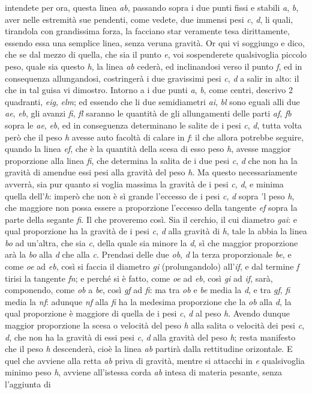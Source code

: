 \documentclass[11pt,twoside,openany]{book}
\begin{document}
intendete per ora, questa linea \emph{ab}, passando sopra i due punti fissi e stabili \emph{a}, \emph{b}, aver nelle estremità sue pendenti, come vedete, due immensi pesi \emph{c}, \emph{d}, li quali, tirandola con grandissima forza, la facciano star veramente tesa dirittamente, essendo essa una semplice linea, senza veruna gravità. Or qui vi soggiungo e dico, che se dal mezzo di quella, che sia il punto \emph{e}, voi sospenderete qualsivoglia piccolo peso, quale sia questo \emph{h}, la linea \emph{ab} cederà, ed inclinandosi verso il punto \emph{f}, ed in consequenza allungandosi, costringerà i due gravissimi pesi \emph{c}, \emph{d} a salir in alto: il che in tal guisa vi dimostro. Intorno a i due punti \emph{a}, \emph{b}, come centri, descrivo 2 quadranti, \emph{eig}, \emph{elm}; ed essendo che li due semidiametri \emph{ai}, \emph{bl} sono eguali alli due \emph{ae}, \emph{eb}, gli avanzi \emph{fi}, \emph{fl} saranno le quantità de gli allungamenti delle parti \emph{af}, \emph{fb} sopra le \emph{ae}, \emph{eb}, ed in conseguenza determinano le salite de i pesi \emph{c}, \emph{d}, tutta volta però che il peso \emph{h} avesse auto facoltà di calare in \emph{f}: il che allora potrebbe seguire, quando la linea \emph{ef}, che è la quantità della scesa di esso peso \emph{h}, avesse maggior proporzione alla linea \emph{fi}, che determina la salita de i due pesi \emph{c}, \emph{d} che non ha la gravità di amendue essi pesi alla gravità del peso \emph{h}. Ma questo necessariamente avverrà, sia pur quanto si voglia massima la gravità de i pesi \emph{c}, \emph{d}, e minima quella dell'\emph{h}: imperò che non è sì grande l'eccesso de i pesi \emph{c}, \emph{d} sopra 'l peso \emph{h}, che maggiore non possa essere a proporzione l'eccesso della tangente \emph{ef} sopra la parte della segante \emph{fi}. Il che proveremo così. Sia il cerchio, il cui diametro \emph{gai}: e qual proporzione ha la gravità de i pesi \emph{c}, \emph{d} alla gravità di \emph{h}, tale la abbia la linea \emph{bo} ad un'altra, che sia \emph{c}, della quale sia minore la \emph{d}, sì che maggior proporzione arà la \emph{bo} alla \emph{d} che alla \emph{c}. Prendasi delle due \emph{ob}, \emph{d} la terza proporzionale \emph{be}, e come \emph{oe} ad \emph{eb}, così si faccia il diametro \emph{gi} (prolungandolo) all'\emph{if}, e dal termine \emph{f} tirisi la tangente \emph{fn}; e perché si è fatto, come \emph{oe} ad \emph{eb}, così \emph{gi} ad \emph{if}, sarà, componendo, come \emph{ob} a \emph{be}, così \emph{gf} ad \emph{fi}: ma tra \emph{ob} e \emph{be} media la \emph{d}, e tra \emph{gf}, \emph{fi} media la \emph{nf}: adunque \emph{nf} alla \emph{fi} ha la medesima proporzione che la \emph{ob} alla \emph{d}, la qual proporzione è maggiore di quella de i pesi \emph{c}, \emph{d} al peso \emph{h}. Avendo dunque maggior proporzione la scesa o velocità del peso \emph{h} alla salita o velocità dei pesi \emph{c}, \emph{d}, che non ha la gravità di essi pesi \emph{c}, \emph{d} alla gravità del peso \emph{h}; resta manifesto che il peso \emph{h} descenderà, cioè la linea \emph{ab} partirà dalla rettitudine orizontale. E quel che avviene alla retta \emph{ab} priva di gravità, mentre si attacchi in \emph{e} qualsivoglia minimo peso \emph{h}, avviene all'istessa corda \emph{ab} intesa di materia pesante, senza l'aggiunta di 
\end{document}
